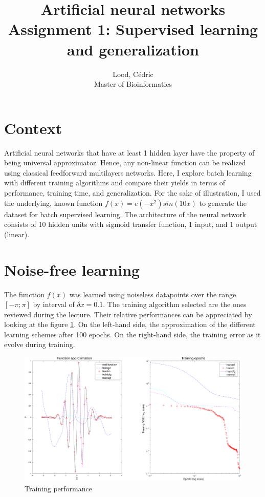 \documentclass[11pt, a4paper]{article}
\title{ \huge Artificial neural networks \\ 
  { \large Assignment 1: Supervised learning and generalization }}
\author{
        Lood, Cédric \\
        \small Master of Bioinformatics
}
\begin{document}
\maketitle

\section{Context}

Artificial neural networks that have at least 1 hidden layer have the
property of being universal
approximator\cite{hornik1989multilayer,leshno1993multilayer}. Hence,
any non-linear function can be realized using classical feedforward
multilayers networks. Here, I explore batch learning with different
training algorithms and compare their yields in terms of performance,
training time, and generalization. For the sake of illustration, I
used the underlying, known function $f(x)=e(-x^2)sin(10x)$ to generate
the dataset for batch supervised learning. The architecture of the
neural network consists of 10 hidden units with sigmoid transfer
function, 1 input, and 1 output (linear).

\section{Noise-free learning}

The function $f(x)$ was learned using noiseless datapoints over the
range $[-\pi;\pi]$ by interval of $\delta x = 0.1$. The training
algorithm selected are the ones reviewed during the lecture. Their
relative performances can be appreciated by looking at the figure
\ref{fig:trainnl}. On the left-hand side, the approximation of the
different learning schemes after 100 epochs. On the right-hand side,
the training error as it evolve during training.

\begin{figure}[H]
  \includegraphics[scale=.43]{training_performance.pdf}
  \caption{Training performance}
  \label{fig:trainnl}
\end{figure}
\end{document}
